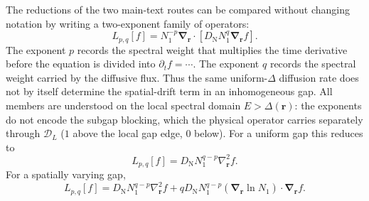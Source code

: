 \documentclass[
  aps,
  prb,
  preprint,
  superscriptaddress,
  longbibliography,
  nofootinbib
]{revtex4-2}
\newcommand{\br}{\mathbf{r}}
\newcommand{\bnabla}{\boldsymbol{\nabla}}
\newcommand{\DOS}{N_1}
\newcommand{\DN}{D_{\mathrm{N}}}
\begin{document}
The reductions of the two main-text routes can be compared without changing
notation by
writing a two-exponent family of operators:
\begin{equation}
  L_{p,q}[f]
  =
  \DOS^{-p}
  \bnabla_{\br}\cdot
  \left[
    \DN \DOS^q \bnabla_{\br}f
  \right].
  \label{eq:Lpq_family}
\end{equation}
The exponent \(p\) records the spectral weight that multiplies the time
derivative before the equation is divided into \(\partial_t f=\cdots\). The
exponent \(q\) records the spectral weight carried by the diffusive flux. Thus
the same uniform-\(\Delta\) diffusion rate does not by itself determine the
spatial-drift term in an inhomogeneous gap. All members are understood
on the local spectral domain \(E>\Delta(\br)\): the exponents do not
encode the subgap blocking, which the physical operator carries
separately through \(\mathcal D_L\) (\(1\) above the local gap edge,
\(0\) below).
For a uniform gap this reduces to
\begin{equation}
  L_{p,q}[f]
  =
  \DN \DOS^{q-p}\nabla_{\br}^2 f.
  \label{eq:Lpq_uniform}
\end{equation}
For a spatially varying gap,
\begin{equation}
  L_{p,q}[f]
  =
  \DN \DOS^{q-p}\nabla_{\br}^2f
  +
  q\DN \DOS^{q-p}
  \left(\bnabla_{\br}\ln\DOS\right)\cdot\bnabla_{\br}f.
  \label{eq:Lpq_expanded}
\end{equation}
\end{document}
